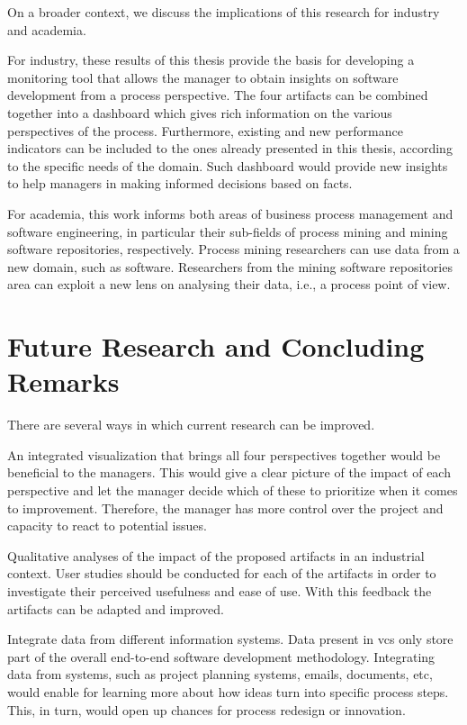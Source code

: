 

On a broader context, we discuss the implications of this research for industry and academia. 

For industry, these results of this thesis provide the basis for developing a monitoring tool that allows the manager to obtain insights on software development from a process perspective. The four artifacts can be combined together into a dashboard which gives rich information on the various perspectives of the process. Furthermore, existing and new performance indicators can be included to the ones already presented in this thesis, according to the specific needs of the domain. Such dashboard would provide new insights to help managers in making informed decisions based on facts. 

For academia, this work informs both areas of business process management and software engineering, in particular their sub-fields of process mining and mining software repositories, respectively. Process mining researchers can use data from a new domain, such as software. Researchers from the mining software repositories area can exploit a new lens on analysing their data, i.e., a process point of view. 


\section{Future Research and Concluding Remarks}
\label{sec:8-future}

There are several ways in which current research can be improved. 

An integrated visualization that brings all four perspectives together would be beneficial to the managers. This would give a clear picture of the impact of each perspective and let the manager decide which of these to prioritize when it comes to improvement. Therefore, the manager has more control over the project and capacity to react to potential issues. 

Qualitative analyses of the impact of the proposed artifacts in an industrial context. User studies should be conducted for each of the artifacts in order to investigate their perceived usefulness and ease of use. With this feedback the artifacts can be adapted and improved. 

Integrate data from different information systems. Data present in \gls{vcs} only store part of the overall end-to-end software development methodology. Integrating data from systems, such as project planning systems, emails, documents, etc, would enable for learning more about how ideas turn into specific process steps. This, in turn, would open up chances for process redesign or innovation. 








